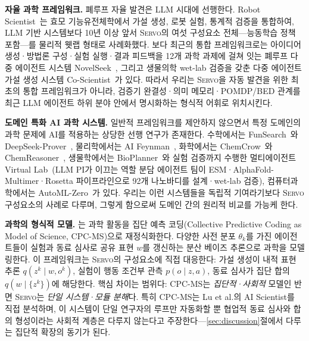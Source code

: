 \documentclass[11pt]{article}
\newcommand{\framework}{\textsc{Servo}}
\begin{document}
\textbf{자율 과학 프레임워크.} 폐루프 자율 발견은 LLM 시대에 선행한다. Robot Scientist~\citep{sparkes2010robot}는 효모 기능유전체학에서 가설 생성, 로봇 실험, 통계적 검증을 통합하여, LLM 기반 시스템보다 10년 이상 앞서 \framework{}의 여섯 구성요소 전체---능동학습 정책~\citep{king2004robot} 포함---를 물리적 웻랩 형태로 사례화했다. 보다 최근의 통합 프레임워크로는 아이디어 생성·방법론 구성·실험 실행·결과 피드백을 12개 과학 과제에 걸쳐 잇는 폐루프 다중 에이전트 시스템 NovelSeek~\citep{zhang2025novelseek}, 그리고 생물의학 wet-lab 검증을 갖춘 다중 에이전트 가설 생성 시스템 Co-Scientist~\citep{gottweis2026coscientist}가 있다. 따라서 우리는 \framework{}을 자동 발견을 위한 최초의 통합 프레임워크가 아니라, 검증기 완결성·의미 메모리·POMDP/BED 관계를 최근 LLM 에이전트 하위 분야 안에서 명시화하는 형식적 어휘로 위치시킨다.

\textbf{도메인 특화 AI 과학 시스템.} 일반적 프레임워크를 제안하지 않으면서 특정 도메인의 과학 문제에 AI를 적용하는 상당한 선행 연구가 존재한다. 수학에서는 FunSearch~\citep{romera2023funsearch}와 DeepSeek-Prover~\citep{xin2024deepseek}, 물리학에서는 AI Feynman~\citep{udrescu2020afeynman}, 화학에서는 ChemCrow~\citep{bran2023chemcrow}와 ChemReasoner~\citep{sprueill2024chemreasoner}, 생물학에서는 BioPlanner~\citep{odonoghue2023bioplanner}와 실험 검증까지 수행한 멀티에이전트 Virtual Lab~\citep{swanson2025virtuallab}(LLM PI가 이끄는 역할 분담 에이전트 팀이 ESM·AlphaFold-Multimer·Rosetta 파이프라인으로 92개 나노바디를 설계·wet-lab 검증), 컴퓨터과학에서는 AutoML-Zero~\citep{real2020automlzero}가 있다. 우리는 이런 시스템들을 독립적 기여라기보다 \framework{} 구성요소의 사례로 다루며, 그렇게 함으로써 도메인 간의 원리적 비교를 가능케 한다.

\textbf{과학의 형식적 모델.} \citet{taniguchi2024cpc}는 과학 활동을 집단 예측 코딩(Collective Predictive Coding as Model of Science, CPC-MS)으로 재정식화한다. 다양한 사전 분포 $\theta_k$를 가진 에이전트들이 실험과 동료 심사로 공유 표현 $w$를 갱신하는 분산 베이즈 추론으로 과학을 모델링한다. 이 프레임워크는 \framework{}의 구성요소에 직접 대응한다: 가설 생성이 내적 표현 추론 $q(z^k \mid w, o^k)$, 실험이 행동 조건부 관측 $p(o \mid z, a)$, 동료 심사가 집단 합의 $q(w \mid \{z^k\})$에 해당한다. 핵심 차이는 범위다: CPC-MS는 \emph{집단적·사회적} 모델인 반면 \framework{}는 \emph{단일 시스템·모듈 분해}다. 특히 CPC-MS는 Lu et al.의 AI Scientist를 직접 분석하며, 이 시스템이 단일 연구자의 루프만 자동화할 뿐 협업적 동료 심사와 합의 형성이라는 사회적 계층은 다루지 않는다고 주장한다---\ref{sec:discussion}절에서 다루는 집단적 확장의 동기가 된다.
\end{document}
